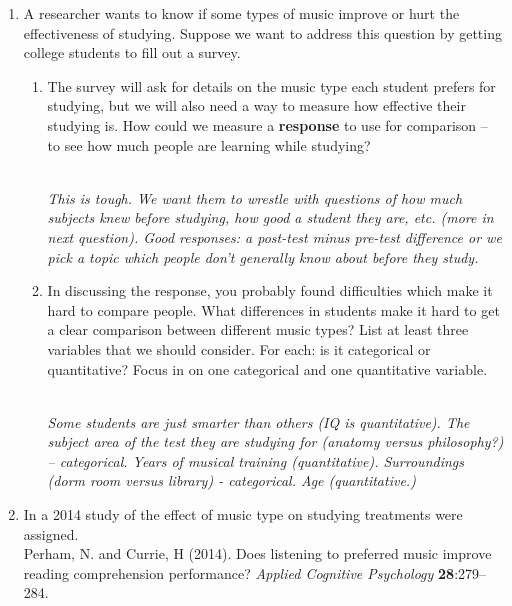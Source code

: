 \begin{enumerate}
\item A researcher wants to know if some types of music  improve or
  hurt the effectiveness of studying.  Suppose we want to address
  this question by getting college students to fill out a survey.
  \begin{enumerate}
  \item \label{response1} The survey will ask for details on the music
    type each student
    prefers for studying, but we will also need a way to measure how
    effective their studying is.  How could we measure a {\bf
      response} to use for comparison --  to see how much people are
    learning while studying?
\begin{students}
        \vspace{3cm}
\end{students}
\begin{key}
  \\ {\it This is tough. We want them to wrestle with questions of how
  much subjects knew before studying, how good a student they are, etc.
  (more in next question).  Good responses:  a post-test
  minus pre-test difference or we pick a topic which
  people don't generally know about before they study.}
\end{key}
     \item\label{lurking} In discussing the response, you probably
       found difficulties which make it hard to compare people.  What
       differences in students 
       make it hard to get a clear comparison between different music
       types?  List at least three variables that we should consider.
       For each: is it categorical or quantitative?  Focus in on
       one categorical and one quantitative variable.
\begin{students}
        \vspace{5cm}
\end{students}
\begin{key}
  \\ {\it Some students are just smarter than others (IQ is
    quantitative). The subject area of the test they are studying for (anatomy
    versus philosophy?) -- categorical. Years of musical training
    (quantitative). Surroundings (dorm room versus library) -
    categorical. Age (quantitative.) }
\end{key}
  \end{enumerate}
\item In a 2014  study of the effect of music type on studying 
  treatments were assigned.\\
   Perham, N. and Currie, H (2014). Does listening to preferred music
   improve reading comprehension performance? {\em Applied Cognitive
     Psychology} {\bf 28}:279--284.


\end{enumerate}
